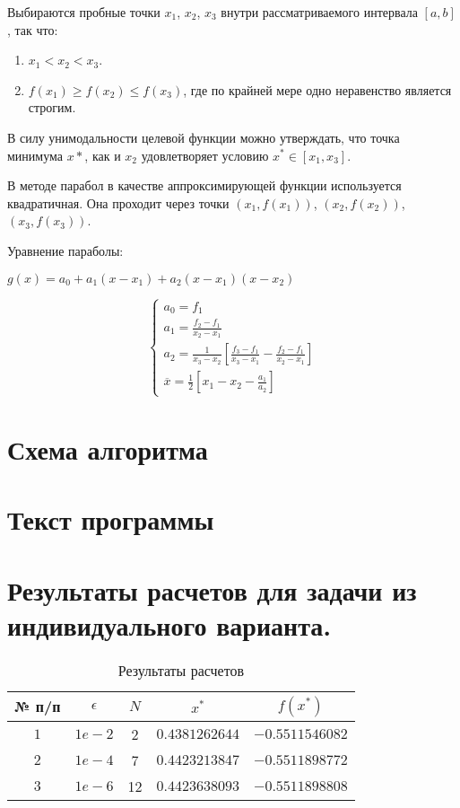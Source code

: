 Выбираются пробные точки $x_1$, $x_2$, $x_3$ внутри рассматриваемого интервала $[a, b]$, так что:
\begin{enumerate}
\item $x_1 < x_2 < x_3$.
\item $f(x_1) \ge f(x_2) \le f(x_3)$, где по крайней мере одно неравенство является строгим.
\end{enumerate}

В силу унимодальности целевой функции можно утверждать, что точка минимума $x*$, как и $x_2$ удовлетворяет условию $x^* \in [x_1, x_3]$.

В методе парабол в качестве аппроксимирующей функции используется квадратичная. Она проходит через точки $(x_1, f(x_1))$, $(x_2, f(x_2))$, $(x_3, f(x_3))$.

Уравнение параболы:

$g(x) = a_0 + a_1(x - x_1) + a_2(x - x_1)(x - x_2)$

\begin{equation*}
\begin{cases}
a_0 = f_1 \\
a_1 = \frac{f_2 - f_1}{x_2 - x_1} \\
a_2 = \frac{1}{x_3 - x_2}\left[\frac{f_3 - f_1}{x_3 - x_1} - \frac{f_2 - f_1}{x_2 - x_1}\right] \\
\overline{x} = \frac{1}{2}\left[x_1 - x_2 - \frac{a_1}{a_2}\right]
\end{cases}
\end{equation*}

\newpage

\section{Схема алгоритма}


\section{Текст программы}


\section{Результаты расчетов для задачи из индивидуального варианта.}

\begin{table}[h]
    \centering
    \small
    \caption{Результаты расчетов }
    \label{tbl:cmp}

    \begin{tabular}{|c|c|c|c|c|}
        \hline
        № п/п & $\epsilon$ & $N$ & $x^*$ & $f(x^*)$ \\\hline
        $1$ & $1e-2$ & 2 & $0.4381262644$ & $-0.5511546082$ \\\hline
        $2$ & $1e-4$ & 7 & $0.4423213847$ & $-0.5511898772$ \\\hline
        $3$ & $1e-6$ & 12 & $0.4423638093$ & $-0.5511898808$ \\\hline
    \end{tabular}
\end{table}